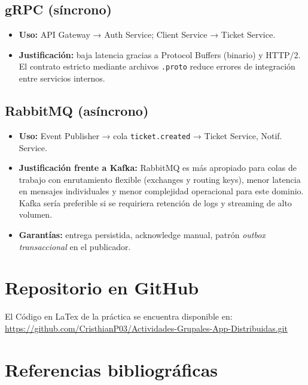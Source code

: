 \documentclass[12pt,a4paper]{article}
\begin{document}
\subsection{gRPC (síncrono)}

\begin{itemize}
  \item \textbf{Uso:} API Gateway → Auth Service; Client Service → Ticket Service.
  \item \textbf{Justificación:} baja latencia gracias a Protocol Buffers (binario) y
        HTTP/2. El contrato estricto mediante archivos \texttt{.proto} reduce errores
        de integración entre servicios internos.
\end{itemize}

\subsection{RabbitMQ (asíncrono)}

\begin{itemize}
  \item \textbf{Uso:} Event Publisher → cola \texttt{ticket.created} → Ticket Service,
        Notif. Service.
  \item \textbf{Justificación frente a Kafka:} RabbitMQ es más apropiado para colas
        de trabajo con enrutamiento flexible (exchanges y routing keys), menor latencia
        en mensajes individuales y menor complejidad operacional para este dominio. Kafka
        sería preferible si se requiriera retención de logs y streaming de alto volumen.
  \item \textbf{Garantías:} entrega persistida, acknowledge manual, patrón
        \emph{outbox transaccional} en el publicador.
\end{itemize}
\vspace{0.5cm}
\section{Repositorio en GitHub}

El Código en LaTex de la práctica se encuentra disponible en:
 \url{https://github.com/CristhianP03/Actividades-Grupales-App-Distribuidas.git}

\newpage


\section{Referencias bibliográficas}
\end{document}
